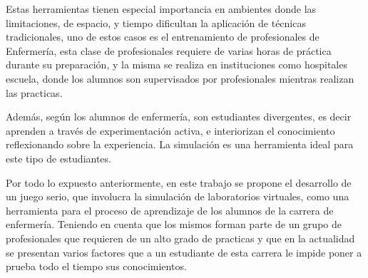 Estas herramientas tienen especial importancia en ambientes donde las limitaciones,
de espacio, y tiempo dificultan la aplicación de técnicas tradicionales, uno de
estos casos es el entrenamiento de profesionales de Enfermería, esta clase de
profesionales requiere de varias horas de práctica durante su preparación, y la
misma se realiza en instituciones como hospitales escuela, donde los alumnos son
supervisados por profesionales mientras realizan las practicas.

Además, según \cite{humphreys2013developing} los alumnos de enfermería, son
estudiantes divergentes, es decir aprenden a través de experimentación activa, e
interiorizan el conocimiento reflexionando sobre la experiencia. La simulación
es una herramienta ideal para este tipo de
estudiantes\cite{humphreys2013developing}.

Por todo lo expuesto anteriormente, en este trabajo se propone el desarrollo de
un juego serio, que involucra la simulación de laboratorios virtuales, como una
herramienta para el proceso de aprendizaje de los alumnos de la carrera de
enfermería. Teniendo en cuenta que los mismos forman parte de un grupo de
profesionales que requieren de un alto grado de practicas y que en la actualidad
se presentan varios factores que a un estudiante de esta carrera le impide poner
a prueba todo el tiempo sus conocimientos.




